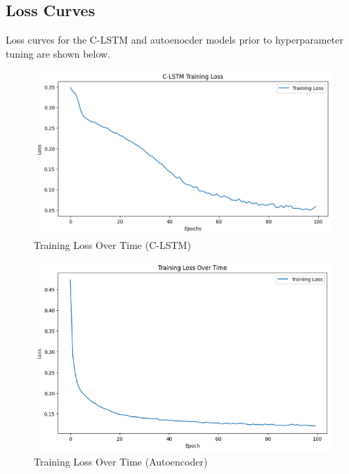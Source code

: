 \documentclass[10pt,twocolumn,letterpaper]{article}
\begin{document}
\begin{appendices}
\section{Loss Curves}
\normalsize
Loss curves for the C-LSTM and autoenocder models prior to hyperparameter tuning are shown below.
\begin{figure}[htbp]
   \centering
   \includegraphics[width=\linewidth]{images/C-LSTM_loss.png}
   \caption{Training Loss Over Time (C-LSTM)}
   \label{fig:c_lstm_training_loss}
   \end{figure}
   
   \begin{figure}[htbp]
   \centering
   \includegraphics[width=\linewidth]{images/autoenc_loss.png}
   \caption{Training Loss Over Time (Autoencoder)}
   \label{fig:autoencoder_training_loss}
   \end{figure}

\end{appendices}
\end{document}
